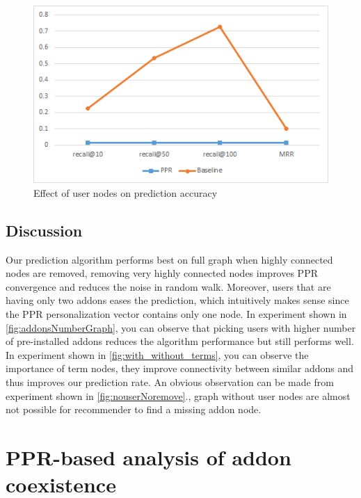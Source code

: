 \documentclass[11pt,oneside]{book}
\let\Oldsection\section
\renewcommand{\section}{\FloatBarrier\Oldsection}
\begin{document}
\begin{figure}[h]
\centering
\includegraphics[scale=.8,angle=0]{figures/nouserNoremove.png}
\caption{Effect of user nodes on prediction accuracy}
\label{fig:nouserNoremove}
\end{figure}


\section{Discussion}
Our prediction algorithm performs best on full graph when highly connected nodes are removed, removing very highly connected nodes improves PPR convergence and reduces the noise in random walk.
Moreover, users that are having only two addons eases the prediction, which intuitively makes sense since the PPR personalization vector contains only one node. In experiment shown in \autoref{fig:addonsNumberGraph}, you can observe that picking users with higher number of pre-installed addons reduces the algorithm performance but still performs well. In experiment shown in \autoref{fig:with_without_terms}, you can observe the importance of term nodes, they improve connectivity between similar addons and thus improves our prediction rate. An obvious observation can be made from experiment shown in \autoref{fig:nouserNoremove}., graph without user nodes are almost not possible for recommender to find a missing addon node.




\chapter{PPR-based analysis of addon coexistence}
\label{chap:Symbiosis}
\end{document}
